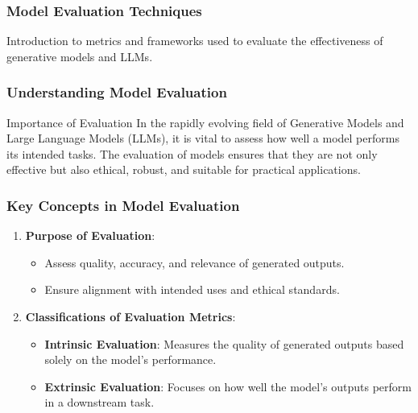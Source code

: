 \documentclass[aspectratio=169]{beamer}
\begin{document}
\begin{frame}[fragile]
    \frametitle{Model Evaluation Techniques}
    Introduction to metrics and frameworks used to evaluate the effectiveness of generative models and LLMs.
\end{frame}

\begin{frame}[fragile]
    \frametitle{Understanding Model Evaluation}
    \begin{block}{Importance of Evaluation}
        In the rapidly evolving field of Generative Models and Large Language Models (LLMs), it is vital to assess how well a model performs its intended tasks. The evaluation of models ensures that they are not only effective but also ethical, robust, and suitable for practical applications.
    \end{block}
\end{frame}

\begin{frame}[fragile]
    \frametitle{Key Concepts in Model Evaluation}
    \begin{enumerate}
        \item \textbf{Purpose of Evaluation}:
            \begin{itemize}
                \item Assess quality, accuracy, and relevance of generated outputs.
                \item Ensure alignment with intended uses and ethical standards.
            \end{itemize}
        
        \item \textbf{Classifications of Evaluation Metrics}:
            \begin{itemize}
                \item \textbf{Intrinsic Evaluation}:
                    Measures the quality of generated outputs based solely on the model's performance.
                
                \item \textbf{Extrinsic Evaluation}:
                    Focuses on how well the model's outputs perform in a downstream task.
            \end{itemize}
    \end{enumerate}
\end{frame}
\end{document}
